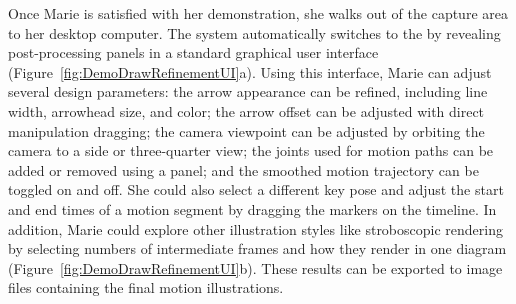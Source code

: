Once Marie is satisfied with her demonstration, she walks out of the capture area to her desktop computer. The system automatically switches to the \phaseII{} by revealing post-processing panels in a standard graphical user interface (Figure~\ref{fig:DemoDrawRefinementUI}a).
Using this interface, Marie can adjust several design parameters:
the arrow appearance can be refined, including line width, arrowhead size, and color;
the arrow offset can be adjusted with direct manipulation dragging; %
the camera viewpoint can be adjusted by orbiting the camera to a side or three-quarter view;
the joints used for motion paths can be added or removed using a panel;
and the smoothed motion trajectory can be toggled on and off.
%
She could also select a different key pose and adjust the start and end times of a motion segment by dragging the markers on the timeline.
%
In addition, Marie could explore other illustration styles like stroboscopic rendering by selecting numbers of intermediate frames and how they render in one diagram (Figure~\ref{fig:DemoDrawRefinementUI}b).
%
These results can be exported to image files containing the final motion illustrations. %
